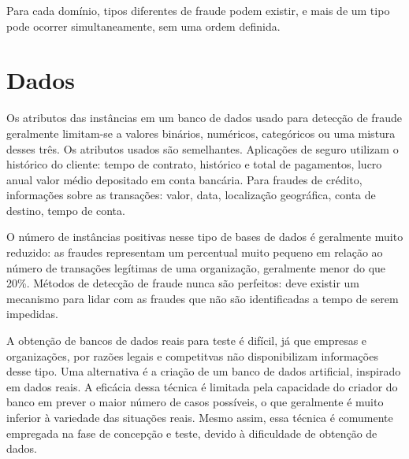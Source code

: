 Para cada domínio, tipos diferentes de fraude podem existir, e mais de um tipo pode ocorrer simultaneamente, sem uma ordem definida. 

\section{Dados}

Os atributos das instâncias em um banco de dados usado para detecção de fraude geralmente limitam-se a valores binários, numéricos, categóricos ou uma mistura desses três. Os atributos usados são semelhantes. Aplicações de seguro utilizam o histórico do cliente: tempo de contrato, histórico e total de pagamentos, lucro anual valor médio depositado em conta bancária. Para fraudes de crédito, informações sobre as transações: valor, data, localização geográfica, conta de destino, tempo de conta.

O número de instâncias positivas nesse tipo de bases de dados é geralmente muito reduzido: as fraudes representam um percentual muito pequeno em relação ao número de transações legítimas de uma organização, geralmente menor do que 20\%. Métodos de detecção de fraude nunca são perfeitos: deve existir um mecanismo para lidar com as fraudes que não são identificadas a tempo de serem impedidas.

A obtenção de bancos de dados reais para teste é difícil, já que empresas e organizações, por razões legais e competitvas não disponibilizam informações desse tipo. Uma alternativa é a criação de um banco de dados artificial, inspirado em dados reais. A eficácia dessa técnica é limitada pela capacidade do criador do banco em prever o maior número de casos possíveis, o que geralmente é muito inferior à variedade das situações reais. Mesmo assim, essa técnica é comumente empregada na fase de concepção e teste, devido à dificuldade de obtenção de dados.

